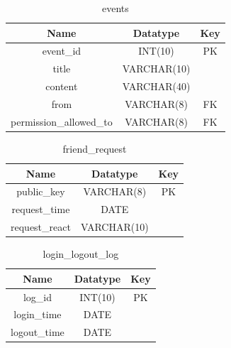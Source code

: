 \begin{table}[!ht]
\caption{events}
\centering
\begin{tabular}{c c c}
\hline\hline
Name                    & Datatype    & Key \\
\hline
event\_id               & INT(10)     & PK  \\
title                   & VARCHAR(10) &     \\
content                 & VARCHAR(40) &     \\
from                    & VARCHAR(8)  & FK  \\
permission\_allowed\_to & VARCHAR(8)  & FK  \\
\hline
\end{tabular}
\label{table:nonlin}
\end{table}

\begin{table}[!ht]
\caption{friend\_request}
\centering
\begin{tabular}{c c c}
\hline\hline
Name               & Datatype    & Key \\
\hline
public\_key        & VARCHAR(8)  & PK  \\
request\_time      & DATE        &     \\
request\_react     & VARCHAR(10) &     \\ %
\hline
\end{tabular}
\label{table:nonlin}
\end{table}

\begin{table}[!ht]
\caption{login\_logout\_log}
\centering
\begin{tabular}{c c c}
\hline\hline
Name               & Datatype    & Key \\
\hline
log\_id            & INT(10)     & PK  \\
login\_time        & DATE        &     \\
logout\_time       & DATE        &     \\
\hline
\end{tabular}
\label{table:nonlin}
\end{table}

\clearpage

